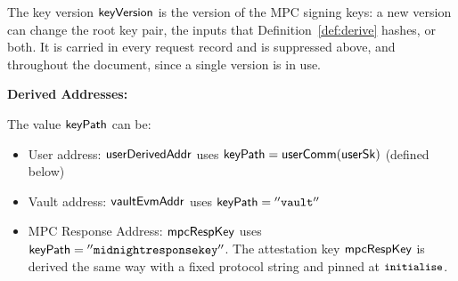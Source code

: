 \noindent The key version $\mathsf{keyVersion}$ is the version of the MPC signing keys: a new version can
change the root key pair, the inputs that Definition~\ref{def:derive} hashes, or both. It is
carried in every request record and is suppressed above, and throughout the document, since a
single version is in use.


\medskip
\noindent
\textbf{Derived Addresses:}

The value $\mathsf{keyPath}$ can be:
\begin{itemize}
    \item User address: $\mathsf{userDerivedAddr}$ uses $\mathsf{keyPath}=\mathsf{userComm}(\mathsf{userSk})$ (defined below)
    \item Vault address:  $\mathsf{vaultEvmAddr}$  uses $\mathsf{keyPath}=\mathtt{''vault''}$
    \item  MPC Response Address: $\mathsf{mpcRespKey}$  uses $\mathsf{keyPath}=\mathtt{''midnight response key''}$. The attestation key $\mathsf{mpcRespKey}$ is derived the
same way with a fixed protocol string and pinned at $\texttt{\small initialise}$.
\end{itemize}


